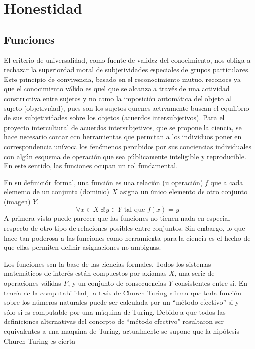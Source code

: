 \documentclass[a4paper,10pt]{book}
\begin{document}
\chapter{Honestidad}

\section{Funciones}

El criterio de universalidad, como fuente de validez del conocimiento, nos obliga a rechazar la superiordad moral de subjetividades especiales de grupos particulares.
Este principio de convivencia, basado en el reconocimiento mutuo, reconoce ya que el conocimiento válido es quel que se alcanza a través de una actividad constructiva entre sujetos y no como la imposición automática del objeto al sujeto (objetividad), pues son los sujetos quienes activamente buscan el equilibrio de sus subjetividades sobre los objetos (acuerdos intersubjetivos).
Para el proyecto intercultural de acuerdos intersubjetivos, que se propone la ciencia, se hace necesario contar con herramientas que permitan a los individuos poner en correspondencia unívoca los fenómenos percibidos por sus conciencias individuales con algún esquema de operación que sea públicamente inteligible y reproducible.
En este sentido, las funciones ocupan un rol fundamental.


En su definición formal, una función es una relación (u operación) $f$ que a cada elemento de un conjunto (dominio) $X$ asigna un único elemento de otro conjunto (imagen) $Y$.
%
\begin{equation}
 \forall x \in X \  \exists! y \in Y \text{ tal que } f(x) = y    
\end{equation}
%
A primera vista puede parecer que las funciones no tienen nada en especial respecto de otro tipo de relaciones posibles entre conjuntos.
Sin embargo, lo que hace tan poderosa a las funciones como herramienta para la ciencia es el hecho de que ellas permiten definir asignaciones no ambiguas.


Los funciones son la base de las ciencias formales.
Todos los sistemas matemáticos de interés están compuestos por axiomas $X$, una serie de operaciones válidas $F$, y un conjunto de consecuencias $Y$ consistentes entre sí.
En teoría de la computabilidad, la tesis de Church-Turing afirma que toda función sobre los números naturales puede ser calculada por un ``método efectivo'' si y sólo si es computable por una máquina de Turing.
Debido a que todos las definiciones alternativas del concepto  de ``método efectivo'' resultaron ser equivalentes a una maquina de Turing, actualmente se supone que la hipótesis Church-Turing es cierta.
\end{document}
